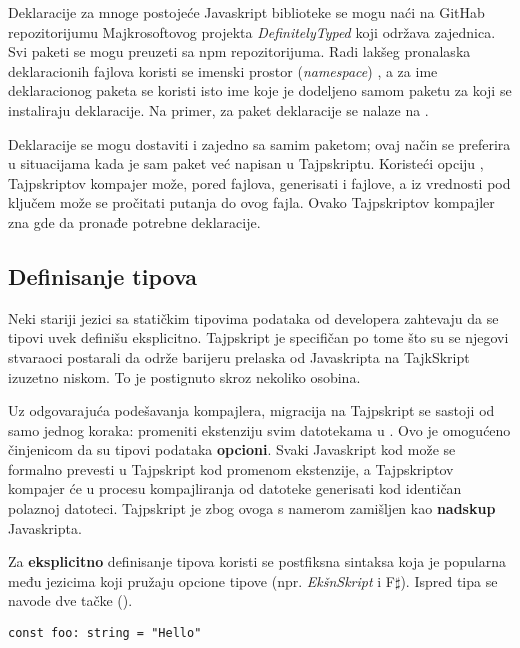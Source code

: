 Deklaracije za mnoge postojeće Javaskript biblioteke se mogu naći na GitHab repozitorijumu Majkrosoftovog projekta \textsl{DefinitelyTyped} koji održava zajednica.
Svi paketi se mogu preuzeti sa npm repozitorijuma.
Radi lakšeg pronalaska deklaracionih fajlova koristi se imenski prostor (\textsl{namespace}) , a za ime deklaracionog paketa se koristi isto ime koje je dodeljeno samom paketu za koji se instaliraju deklaracije.
Na primer, za paket  deklaracije se nalaze na .

Deklaracije se mogu dostaviti i zajedno sa samim paketom; ovaj način se preferira u situacijama kada je sam paket već napisan u Tajpskriptu.
Koristeći opciju , Tajpskriptov kompajer može, pored  fajlova, generisati i  fajlove, a iz  vrednosti pod ključem  može se pročitati putanja do ovog fajla.
Ovako Tajpskriptov kompajler zna gde da pronađe potrebne deklaracije.

\subsection{Definisanje tipova}

Neki stariji jezici sa statičkim tipovima podataka od developera zahtevaju da se tipovi uvek definišu eksplicitno.
Tajpskript je specifičan po tome što su se njegovi stvaraoci postarali da održe barijeru prelaska od Javaskripta na TajkSkript izuzetno niskom.
To je postignuto skroz nekoliko osobina.

Uz odgovarajuća podešavanja kompajlera, migracija na Tajpskript se sastoji od samo jednog koraka: promeniti ekstenziju svim  datotekama u .
Ovo je omogućeno činjenicom da su tipovi podataka \textbf{opcioni}.
Svaki Javaskript kod može se formalno prevesti u Tajpskript kod promenom ekstenzije, a Tajpskriptov kompajer će u procesu kompajliranja od  datoteke generisati kod identičan polaznoj  datoteci.
Tajpskript je zbog ovoga s namerom zamišljen kao \textbf{nadskup} Javaskripta.

Za \textbf{eksplicitno} definisanje tipova koristi se postfiksna sintaksa koja je popularna među jezicima koji pružaju opcione tipove (npr. \textsl{EkšnSkript} i F$\sharp$).
Ispred tipa se navode dve tačke (\code{:}).

\begin{verbatim}
const foo: string = "Hello"
\end{verbatim}

